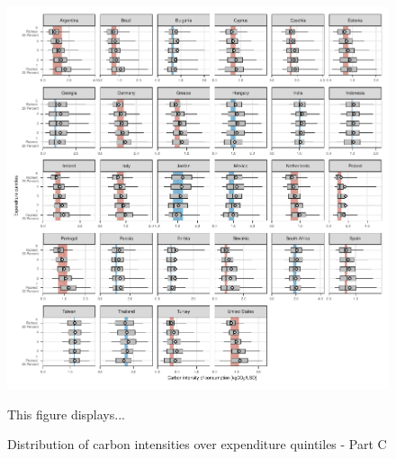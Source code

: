 \documentclass[12pt, a4paper]{article}
\newenvironment{subcaption}
{\strut
\vspace{-5pt}
\begin{minipage}[b]{0.9\textwidth}
  \hspace*{-\parindent}
  \footnotesize}
 {\end{minipage}}
\begin{document}
\begin{figure}[ht!]
  \centering
  \caption{Distribution of carbon intensities over expenditure quintiles - Part C} \label{fig:Quint_C}
  \includegraphics{1_Figures/Figures_Appendix/Figure_1_2017_Appendix_3}
  \begin{subcaption}
    This figure displays...
  \end{subcaption}

\end{figure}

\clearpage

\end{document}
